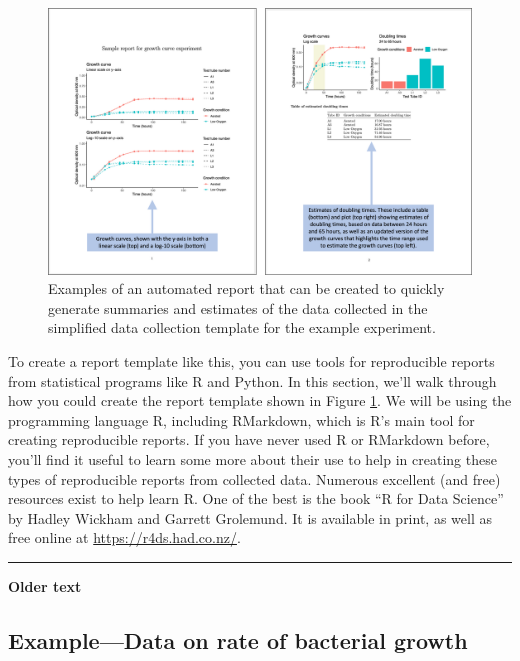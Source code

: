 \documentclass[]{tufte-book}
\begin{document}
\begin{figure}
\includegraphics[width=\textwidth]{figures/growth_curve_report} \caption[Examples of an automated report that can be created to quickly generate summaries and estimates of the data collected in the simplified data collection template for the example experiment]{Examples of an automated report that can be created to quickly generate summaries and estimates of the data collected in the simplified data collection template for the example experiment.}\label{fig:growthreport2}
\end{figure}

To create a report template like this, you can use tools for reproducible
reports from statistical programs like R and Python. In this section, we'll walk
through how you could create the report template shown in Figure
\ref{fig:growthreport2}. We will be using the programming language R, including
RMarkdown, which is R's main tool for creating reproducible reports. If you have
never used R or RMarkdown before, you'll find it useful to learn some more about
their use to help in creating these types of reproducible reports from collected
data. Numerous excellent (and free) resources exist to help learn R. One of the
best is the book ``R for Data Science'' by Hadley Wickham and Garrett Grolemund.
It is available in print, as well as free online at \url{https://r4ds.had.co.nz/}.

\begin{center}\rule{0.5\linewidth}{0.5pt}\end{center}

\textbf{Older text}

\hypertarget{exampledata-on-rate-of-bacterial-growth-1}{%
\subsection{Example---Data on rate of bacterial growth}\label{exampledata-on-rate-of-bacterial-growth-1}}
\end{document}
